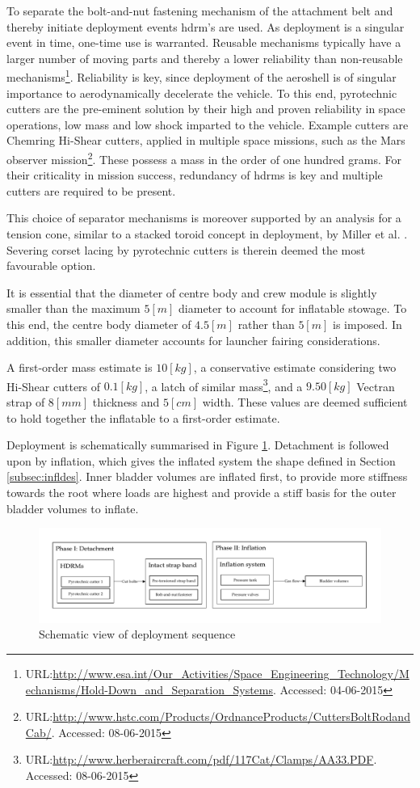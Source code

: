 To separate the bolt-and-nut fastening mechanism of the attachment belt and thereby initiate deployment events \gls{hdrm}'s are used. As deployment is a singular event in time, one-time use is warranted. Reusable mechanisms typically have a larger number of moving parts and thereby a lower reliability than non-reusable mechanisms\footnote{URL:\url{http://www.esa.int/Our_Activities/Space_Engineering_Technology/Mechanisms/Hold-Down_and_Separation_Systems}. Accessed: 04-06-2015}. Reliability is key, since deployment of the aeroshell is of singular importance to aerodynamically decelerate the vehicle. To this end, pyrotechnic cutters are the pre-eminent solution by their high and proven reliability in space operations, low mass and low shock imparted to the vehicle. Example cutters are Chemring Hi-Shear cutters, applied in multiple space missions, such as the Mars observer mission\footnote{URL:\url{http://www.hstc.com/Products/OrdnanceProducts/CuttersBoltRodandCab/}. Accessed: 08-06-2015}. These possess a mass in the order of one hundred grams. For their criticality in mission success, redundancy of \glspl{hdrm} is key and multiple cutters are required to be present. 

This choice of separator mechanisms is moreover supported by an analysis for a tension cone, similar to a stacked toroid concept in deployment, by Miller et al. \cite{Miller2014}. Severing corset lacing by pyrotechnic cutters is therein deemed the most favourable option.


It is essential that the diameter of centre body and crew module is slightly smaller than the maximum $5 \left[m\right]$ diameter to account for inflatable stowage. To this end, the centre body diameter of $4.5 \left[m\right]$ rather than $5 \left[m\right]$ is imposed. In addition, this smaller diameter accounts for launcher fairing considerations.


A first-order mass estimate is $10 \left[kg\right]$, a conservative estimate considering two Hi-Shear cutters of $0.1 \left[kg\right]$, a latch of similar mass\footnote{URL:\url{http://www.herberaircraft.com/pdf/117Cat/Clamps/AA33.PDF}. Accessed: 08-06-2015}, and a $9.50 \left[kg\right]$ Vectran strap of $8 \left[mm\right]$ thickness and $5 \left[cm\right]$ width. These values are deemed sufficient to hold together the inflatable to a first-order estimate.

Deployment is schematically summarised in Figure \ref{fig:deplflow}. Detachment is followed upon by inflation, which gives the inflated system the shape defined in Section \ref{subsec:infldes}. Inner bladder volumes are inflated first, to provide more stiffness towards the root where loads are highest and provide a stiff basis for the outer bladder volumes to inflate.

\begin{figure}[h]
		\centering
		\includegraphics[width=1.0\textwidth]{./Figure/Structure/Deployment.pdf}
		\caption{Schematic view of deployment sequence}
		\label{fig:deplflow}
\end{figure}